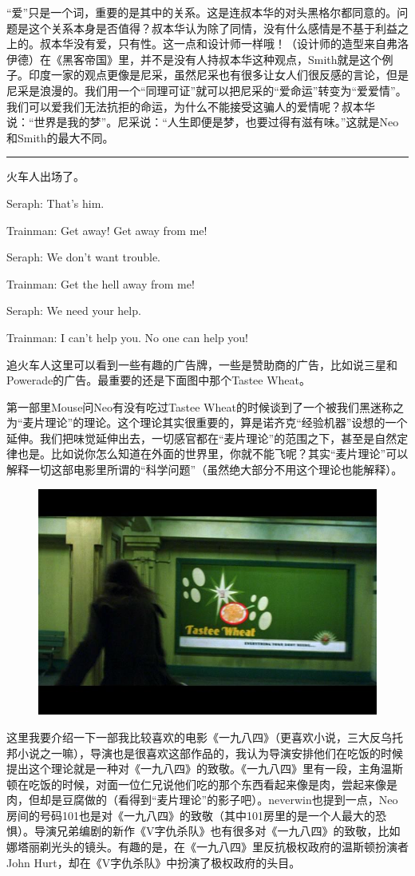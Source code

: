\documentclass[UTF8]{ctexart}
\newcommand{\myparsep}{\noindent \rule[0.5ex]{\linewidth}{1pt}}
\newenvironment{myquote}{\color{green} \setlength{\leftskip}{6em} \setlength{\rightskip}{4em} \setlength{\parindent}{-2em}}{\par}
\begin{document}
“爱”只是一个词，重要的是其中的关系。这是连叔本华的对头黑格尔都同意的。问题是这个关系本身是否值得？叔本华认为除了同情，没有什么感情是不基于利益之上的。叔本华没有爱，只有性。这一点和设计师一样哦！（设计师的造型来自弗洛伊德）在《黑客帝国》里，并不是没有人持叔本华这种观点，Smith就是这个例子。印度一家的观点更像是尼采，虽然尼采也有很多让女人们很反感的言论，但是尼采是浪漫的。我们用一个“同理可证”就可以把尼采的“爱命运”转变为“爱爱情”。我们可以爱我们无法抗拒的命运，为什么不能接受这骗人的爱情呢？叔本华说：“世界是我的梦”。尼采说：“人生即便是梦，也要过得有滋有味。”这就是Neo和Smith的最大不同。

\myparsep

火车人出场了。

\begin{myquote}
Seraph: That's him.

Trainman: Get away! Get away from me!

Seraph: We don't want trouble.

Trainman: Get the hell away from me!

Seraph: We need your help.

Trainman: I can't help you. No one can help you!
\end{myquote}

追火车人这里可以看到一些有趣的广告牌，一些是赞助商的广告，比如说三星和Powerade的广告。最重要的还是下面图中那个Tastee Wheat。

第一部里Mouse问Neo有没有吃过Tastee Wheat的时候谈到了一个被我们黑迷称之为“麦片理论”的理论。这个理论其实很重要的，算是诺齐克“经验机器”设想的一个延伸。我们把味觉延伸出去，一切感官都在“麦片理论”的范围之下，甚至是自然定律也是。比如说你怎么知道在外面的世界里，你就不能飞呢？其实“麦片理论”可以解释一切这部电影里所谓的“科学问题”（虽然绝大部分不用这个理论也能解释）。

\begin{figure}[htb]
\centering
\includegraphics[width=0.5\linewidth]{fig/4000843531b7cf1190ef39a9.jpg}
\end{figure}

这里我要介绍一下一部我比较喜欢的电影《一九八四》（更喜欢小说，三大反乌托邦小说之一嘛），导演也是很喜欢这部作品的，我认为导演安排他们在吃饭的时候提出这个理论就是一种对《一九八四》的致敬。《一九八四》里有一段，主角温斯顿在吃饭的时候，对面一位仁兄说他们吃的那个东西看起来像是肉，尝起来像是肉，但却是豆腐做的（看得到“麦片理论”的影子吧）。neverwin也提到一点，Neo房间的号码101也是对《一九八四》的致敬（其中101房里的是一个人最大的恐惧）。导演兄弟编剧的新作《V字仇杀队》也有很多对《一九八四》的致敬，比如娜塔丽剃光头的镜头。有趣的是，在《一九八四》里反抗极权政府的温斯顿扮演者John Hurt，却在《V字仇杀队》中扮演了极权政府的头目。
\end{document}

